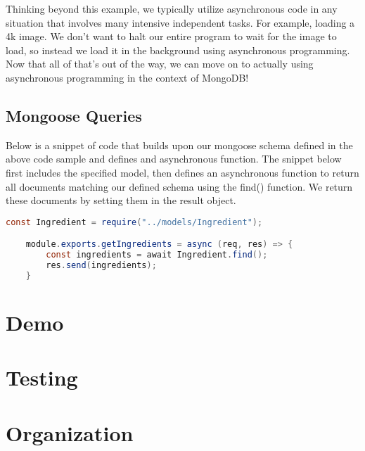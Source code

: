 Thinking beyond this example, we typically utilize asynchronous code in any situation that involves many intensive independent tasks. For example, loading a 4k image. We don't want to halt our entire program to wait for the image to load, so instead we load it in the background using asynchronous programming. Now that all of that's out of the way, we can move on to actually using asynchronous programming in the context of MongoDB!

\subsection*{Mongoose Queries}

Below is a snippet of code that builds upon our mongoose schema defined in the above code sample and defines and asynchronous function. The snippet below first includes the specified model, then defines an asynchronous function to return all documents matching our defined schema using the find() function. We return these documents by setting them in the result object.

\begin{lstlisting}[language=Java]
    const Ingredient = require("../models/Ingredient");

    module.exports.getIngredients = async (req, res) => {
        const ingredients = await Ingredient.find();
        res.send(ingredients);
    }
\end{lstlisting}
    
\section{Demo}

\section{Testing}

\section{Organization}

